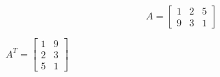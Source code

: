 \begin{example}[]
	\[A = \begin{bmatrix}  1 & 2 & 5 \\ 9 & 3 & 1 \end{bmatrix} \]
\end{example}
\begin{solution}[]
	$A^T = \begin{bmatrix} 1 & 9 \\ 2 & 3 \\ 5 & 1 \end{bmatrix} $
\end{solution}






\newpage



